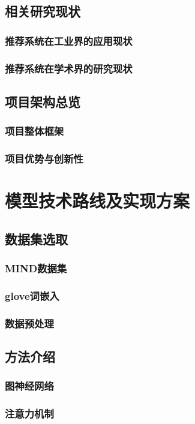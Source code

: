 \documentclass[withoutpreface,bwprint]{cumcmthesis} %
\begin{document}
	\subsection{相关研究现状}
	\subsubsection{ 推荐系统在工业界的应用现状}
	\subsubsection{ 推荐系统在学术界的研究现状}
	\subsection{项目架构总览}
	\subsubsection{ 项目整体框架}
	\subsubsection{ 项目优势与创新性}
	\newpage
	\section{模型技术路线及实现方案}
	\subsection{数据集选取}
	\subsubsection{ MIND数据集}
	\subsubsection{ glove词嵌入}
	\subsubsection{ 数据预处理}
	\subsection{方法介绍}
	\subsubsection{ 图神经网络}
	\subsubsection{ 注意力机制}
\end{document}
